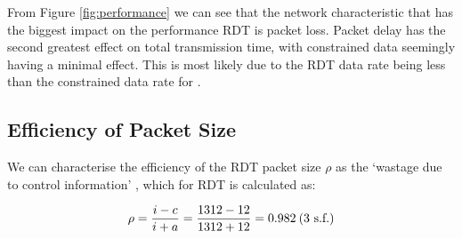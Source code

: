 From Figure \ref{fig:performance} we can see that the network characteristic that has the biggest impact on the performance RDT is packet loss. Packet delay has the second greatest effect on total transmission time, with constrained data seemingly having a minimal effect. This is most likely due to the RDT data rate being less than the constrained data rate for .


\subsection{Efficiency of Packet Size}

We can characterise the efficiency of the RDT packet size $\rho$ as the `wastage due to control information' \cite{slides}, which for RDT is calculated as:

\begin{align*}
    \rho = \frac{i - c}{i + a} = \frac{1312 - 12}{1312 + 12} = 0.982 \text{\:(3 s.f.)}
\end{align*}